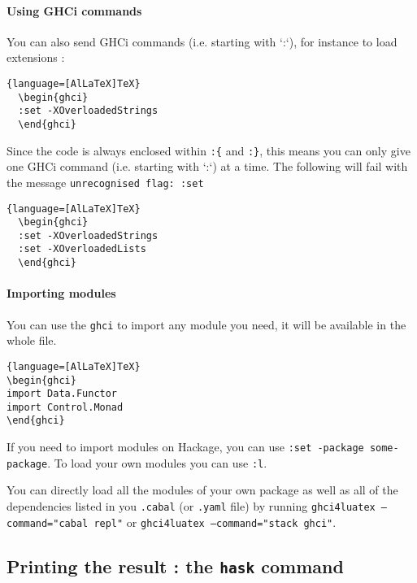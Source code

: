 \documentclass{article}
\begin{document}
\paragraph{Using GHCi commands} You can also send GHCi commands (i.e. starting with `:`), for instance to load extensions :

  \begin{lstlisting}{language=[AlLaTeX]TeX}
  \begin{ghci}
  :set -XOverloadedStrings
  \end{ghci}
  \end{lstlisting}

\begin{warningbox}
  Since the code is always enclosed within \texttt{:\{} and \texttt{:\}}, this means you can only give one GHCi command (i.e. starting with `:`) at a time. The following will fail with the message \texttt{unrecognised flag: :set}
  \begin{lstlisting}{language=[AlLaTeX]TeX}
  \begin{ghci}
  :set -XOverloadedStrings
  :set -XOverloadedLists
  \end{ghci}
  \end{lstlisting}
\end{warningbox}


\paragraph{Importing modules}
You can use the \texttt{ghci} to import any module you need, it will be available in the whole file.

\begin{lstlisting}{language=[AlLaTeX]TeX}
\begin{ghci}
import Data.Functor
import Control.Monad
\end{ghci}
\end{lstlisting}

If you need to import modules on Hackage, you can use \texttt{:set -package some-package}. To load your own modules you can use \texttt{:l}.

\begin{tipbox}
  You can directly load all the modules of your own package as well as all of the dependencies listed in you \texttt{.cabal} (or \texttt{.yaml} file) by running \texttt{ghci4luatex --command="cabal repl"} or \texttt{ghci4luatex --command="stack ghci"}.
\end{tipbox}


\subsection{Printing the result : the \texttt{hask} command}
\end{document}
